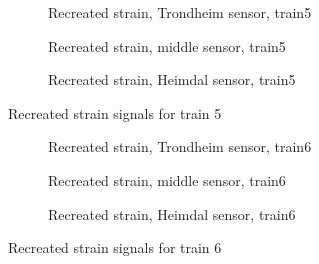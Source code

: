 \begin{figure}[h]
  \begin{subfigure}[t]{0.9\textwidth}
    \centering
    
    \caption{Recreated strain, Trondheim sensor, train5} %
    \label{recreated_sensor_trond_train5}
  \end{subfigure}
%
  \begin{subfigure}[t]{0.9\textwidth}
    \centering
    
    \caption{Recreated strain, middle sensor, train5} %
    \label{recreated_sensor_middle_train5}
  \end{subfigure}
%
  \begin{subfigure}[t]{0.9\textwidth}
    \centering
    
    \caption{Recreated strain, Heimdal sensor, train5} %
    \label{recreated_sensor_heimdal_train5}
  \end{subfigure}
%
  \caption{Recreated strain signals for train 5}
  \label{fig:recreated_strains_train5}
\end{figure}
%
%
%
\begin{figure}[h]
  \begin{subfigure}[t]{0.9\textwidth}
    \centering
    
    \caption{Recreated strain, Trondheim sensor, train6} %
    \label{recreated_sensor_trond_train6}
  \end{subfigure}
%
  \begin{subfigure}[t]{0.9\textwidth}
    \centering
    
    \caption{Recreated strain, middle sensor, train6} %
    \label{recreated_sensor_middle_train6}
  \end{subfigure}
%
  \begin{subfigure}[t]{0.9\textwidth}
    \centering
    
    \caption{Recreated strain, Heimdal sensor, train6} %
    \label{recreated_sensor_heimdal_train6}
  \end{subfigure}
%
  \caption{Recreated strain signals for train 6}
  \label{fig:recreated_strains_train6}
\end{figure}
%

